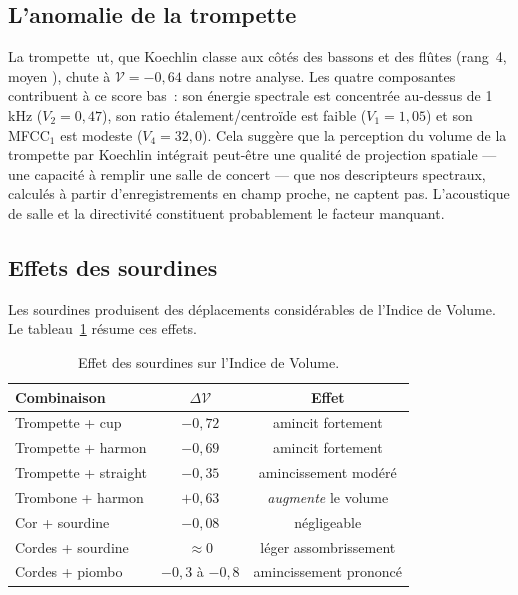 \documentclass[journal]{IEEEtran}
\begin{document}
\subsection{L'anomalie de la trompette}

La trompette~ut, que Koechlin classe aux côtés des bassons et des flûtes (rang~4, \og moyen \fg), chute à $\mathcal{V} = -0{,}64$ dans notre analyse. Les quatre composantes contribuent à ce score bas~: son énergie spectrale est concentrée au-dessus de 1\,kHz ($V_2 = 0{,}47$), son ratio étalement/centroïde est faible ($V_1 = 1{,}05$) et son MFCC$_1$ est modeste ($V_4 = 32{,}0$). Cela suggère que la perception du \og volume \fg{} de la trompette par Koechlin intégrait peut-être une qualité de projection spatiale --- une capacité à remplir une salle de concert --- que nos descripteurs spectraux, calculés à partir d'enregistrements en champ proche, ne captent pas. L'acoustique de salle et la directivité constituent probablement le facteur manquant.

\subsection{Effets des sourdines}

Les sourdines produisent des déplacements considérables de l'Indice de Volume. Le tableau~\ref{tab:mutes} résume ces effets.

\begin{table}[!t]
\centering
\caption{Effet des sourdines sur l'Indice de Volume.}
\label{tab:mutes}
\small
\begin{tabular}{@{}lcc@{}}
\toprule
\textbf{Combinaison} & $\Delta\mathcal{V}$ & \textbf{Effet} \\
\midrule
Trompette + cup        & $-0{,}72$ & amincit fortement \\
Trompette + harmon     & $-0{,}69$ & amincit fortement \\
Trompette + straight   & $-0{,}35$ & amincissement modéré \\
Trombone + harmon      & $+0{,}63$ & \textit{augmente} le volume \\
Cor + sourdine         & $-0{,}08$ & négligeable \\
Cordes + sourdine      & $\approx 0$ & léger assombrissement \\
Cordes + piombo        & $-0{,}3$ à $-0{,}8$ & amincissement prononcé \\
\bottomrule
\end{tabular}
\end{table}
\end{document}
